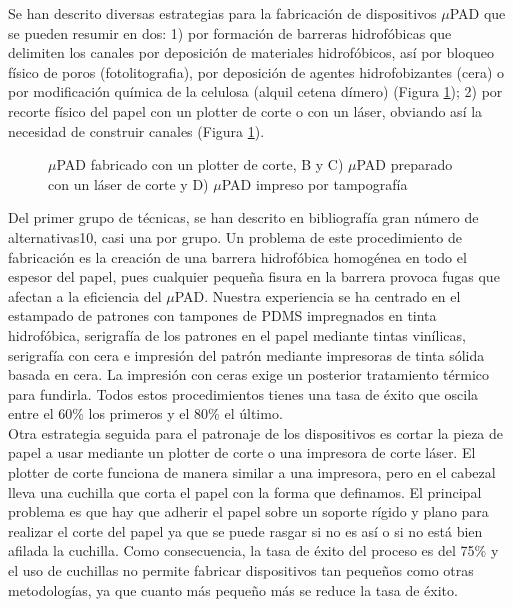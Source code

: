 \documentclass{article}
\begin{document}
Se han descrito diversas estrategias para la fabricación de dispositivos $\mu$PAD que se pueden resumir en dos: 1) por formación de barreras hidrofóbicas que delimiten los canales por deposición de materiales hidrofóbicos, así por bloqueo físico de poros (fotolitografia), por deposición de agentes hidrofobizantes (cera) o por modificación química de la celulosa (alquil cetena dímero) (Figura \ref{fig:papel}); 2) por recorte físico del papel con un plotter de corte o con un láser, obviando así la necesidad de construir canales\cite{Cate2015} (Figura \ref{fig:papel}).\\





\begin{figure}[h]
\caption{ $\mu$PAD fabricado con un plotter de corte, B y C) $\mu$PAD preparado con un láser de corte y D) $\mu$PAD impreso por tampografía}
\label{fig:papel}
\end{figure}

Del primer grupo de técnicas, se han descrito en bibliografía gran número de alternativas10, casi una por grupo. Un problema de este procedimiento de fabricación es la creación de una barrera hidrofóbica homogénea en todo el espesor del papel, pues cualquier pequeña fisura en la barrera provoca fugas que afectan a la eficiencia del $\mu$PAD. Nuestra experiencia se ha centrado en el estampado de patrones con tampones de PDMS impregnados en tinta hidrofóbica, serigrafía de los patrones en el papel mediante tintas vinílicas, serigrafía con cera e impresión del patrón mediante impresoras de tinta sólida basada en cera\cite{Lopez-Ruiz2014}. La impresión con ceras exige un posterior tratamiento térmico para fundirla. Todos estos procedimientos tienes una tasa de éxito que oscila entre el 60\% los primeros y el 80\% el último.\\ 

Otra estrategia seguida para el patronaje de los dispositivos es cortar la pieza de papel a usar mediante un plotter de corte o una impresora de corte láser. El plotter de corte funciona de manera similar a una impresora, pero en el cabezal lleva una cuchilla que corta el papel con la forma que definamos. El principal problema es que hay que adherir el papel sobre un soporte rígido y plano para realizar el corte del papel ya que se puede rasgar si no es así o si no está bien afilada la cuchilla. Como consecuencia, la tasa de éxito del proceso es del 75\% y el uso de cuchillas no permite fabricar dispositivos tan pequeños como otras metodologías, ya que cuanto más pequeño más se reduce la tasa de éxito.\\ 
\end{document}
